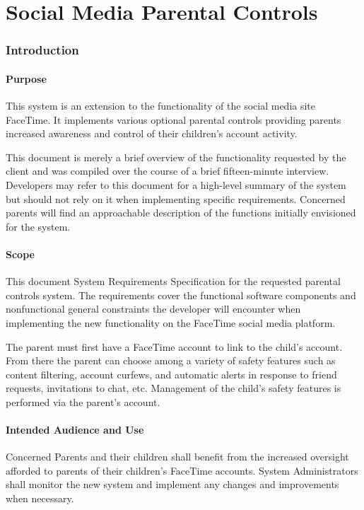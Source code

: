 \documentclass[12pt]{article}
\begin{document}
\pagebreak
\part{Social Media Parental Controls}

\section{Introduction}

\subsection{Purpose}

This system is an extension to the functionality of the social media site FaceTime. It implements various
optional parental controls providing parents increased awareness and control of their children’s account activity.

This document is merely a brief overview of the functionality requested by the client and was compiled over the
course of a brief fifteen-minute interview. Developers may refer to this document for a high-level summary of the
system but should not rely on it when implementing specific requirements. Concerned parents will find an
approachable description of the functions initially envisioned for the system.

\subsection{Scope}

This document System Requirements Specification for the requested parental controls system. The requirements
cover the functional software components and nonfunctional general constraints the developer will encounter
when implementing the new functionality on the FaceTime social media platform.

The parent must first have a FaceTime account to link to the child’s account. From there the parent can
choose among a variety of safety features such as content filtering, account curfews, and automatic alerts
in response to friend requests, invitations to chat, etc. Management of the child’s safety features is performed
via the parent’s account.

\subsection{Intended Audience and Use}

Concerned Parents and their children shall benefit from the increased oversight afforded to parents of
their children’s FaceTime accounts. System Administrators shall monitor the new system and implement any
changes and improvements when necessary.
\end{document}
